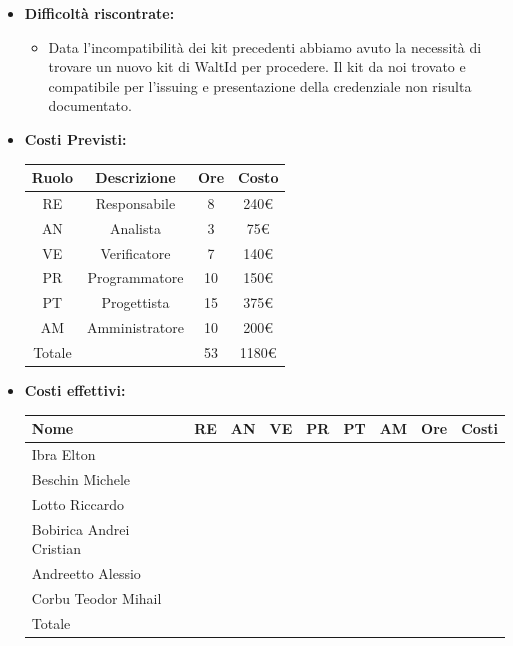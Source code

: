 \begin{itemize}
\begin{itemize}
                
            \end{itemize}
            \item \textbf{Difficoltà riscontrate:}
             \begin{itemize}
                \item  Data l'incompatibilità dei kit precedenti abbiamo avuto la necessità di trovare un nuovo kit di WaltId per procedere. Il kit da noi trovato e compatibile per l'issuing e presentazione della credenziale non risulta documentato.
             \end{itemize}
            \item \textbf{Costi Previsti:}
            \begin{longtable}{|c|c|c|c|}
                \hline
                Ruolo & Descrizione & Ore & Costo \\
                \hline
                RE & Responsabile & 8 &  240€\\
                \hline
                AN & Analista & 3 &  75€\\
                \hline
                VE & Verificatore & 7 & 140€ \\
                \hline
                PR & Programmatore & 10 &  150€\\
                \hline
                PT & Progettista & 15 &  375€\\
                \hline
                AM & Amministratore & 10 &  200€\\
                \hline
                Totale & &  53 &  1180€\\
                \hline
                \end{longtable}
            \item \textbf{Costi effettivi:}
            \begin{longtable}{|p{}|c|c|c|c|c|c|c|c|}
                \hline
                Nome & RE & AN & VE & PR & PT & AM & Ore & Costi\\
                \hline
                Ibra \newline Elton & & & & & & & & \\
                \hline
                Beschin Michele & & & & & & & & \\
                \hline
                Lotto \newline Riccardo & & & & & & & & \\
                \hline
                Bobirica Andrei Cristian & & & & & & & & \\
                \hline
                Andreetto Alessio & & & & & & & & \\
                \hline
                Corbu Teodor Mihail & & & & & & & & \\
                \hline
                Totale & & & & & & & & \\
                \hline
            \end{longtable}
            \end{itemize}


